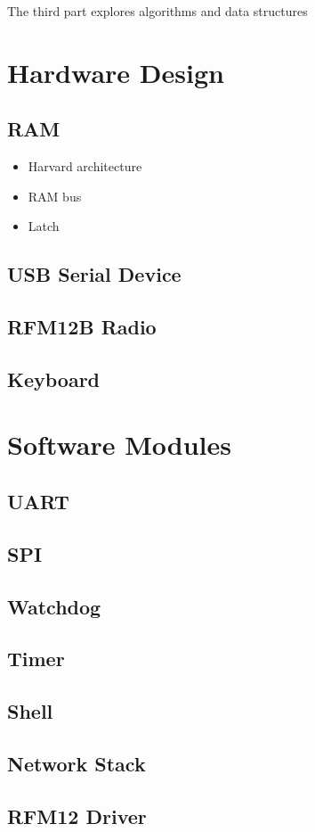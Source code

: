 The third part explores algorithms and data structures 

\chapter{Hardware Design}
\section{RAM}
\begin{itemize}
\item Harvard architecture
\item RAM bus
\item Latch
\end{itemize}
\section{USB Serial Device}
\section{RFM12B Radio}
\section{Keyboard}

\chapter{Software Modules}
\section{UART}
\section{SPI}
\section{Watchdog}
\section{Timer}
\section{Shell}
\section{Network Stack}
\section{RFM12 Driver}

